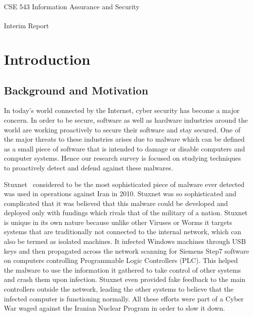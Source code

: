 \documentclass[16pt]{article}
\title{\fulltitle}
\author{Tejas Khairnar (1207690220, Group Leader) \\Sujay Vaishampayan (1209248166, Deputy Group Leader)\\  Zhibo Sun(1207644187)\\Harshil Maskai (1209174092)\\ Aloma Lopes (1209273126)\\ Chaitanya Palaka (1209261868)\\ Varun Chandrasekar (1209248010) \\ Kunal Bansal (1211213169) \\ Raj Dalvi (1209232176) \\ Vimal Vadivelu (1209203043)\\ \\
		Arizona State University}
\begin{document}
	\begingroup
		\fontsize{15pt}{15pt}\selectfont
		\begin{center}
			CSE 543 Information Assurance and Security \\~\\
			Interim Report
		\end{center}
	\endgroup
	{\let\newpage\relax\maketitle}
	\section{Introduction}
	\subsection{Background and Motivation}
	In today’s world connected by the Internet, cyber security has become a major concern. In order
to be secure, software as well as hardware industries around the world are working proactively to
secure their software and stay secured. One of the major threats to these industries arises due to
malware which can be defined as a small piece of software that is intended to damage or disable
computers and computer systems. Hence our research survey is focused on studying techniques
to proactively detect and defend against these malwares.

Stuxnet~\cite{creators2013kill, stuxnet} considered to be the most sophisticated piece of malware ever detected was used in operations against Iran in 2010. Stuxnet was so sophisticated and complicated that it was believed that this malware could be developed and deployed only with fundings which rivals that of the military of a nation. Stuxnet is unique in its own nature because unlike other Viruses or Worms it targets systems that are traditionally not connected to the internal network, which can also be termed as isolated machines. It infected Windows machines through USB keys and then propagated across the network scanning for Siemens Step7 software on computers controlling Programmable Logic Controllers (PLC). This helped the malware to use the information it gathered to take control of other systems and crash them upon infection. Stuxnet even provided fake feedback to the main controllers outside the network, leading the other systems to believe that the infected computer is functioning normally. All these efforts were part of a Cyber War waged against the Iranian Nuclear Program in order to slow it down.
\end{document}
